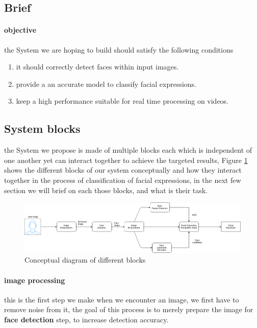 \subsection{Brief}
\paragraph{objective}
the System we are hoping to build should satisfy the following conditions
\begin{enumerate}
	\item it should correctly detect faces within input images.
	\item provide a an accurate model to classify facial expressions.
	\item keep a high performance suitable for real time processing on videos.
\end{enumerate}

\subsection{System blocks}
the System we propose is made of multiple blocks each which is independent of one another yet can interact together to achieve the targeted results, Figure 
\ref{fig:facial_expression_detection} shows the different blocks of our system conceptually and how they interact together in the process of classification of facial expressions, in the next few section we will brief on each those blocks, and what is their task. 

\begin{figure}
	\centering
	\includegraphics[width=\textwidth]{images/facial_expression_detection.png}
	\caption{Conceptual diagram of different blocks}
	\label{fig:facial_expression_detection}
\end{figure}

\paragraph{image processing}
this is the first step we make when we encounter an image, we first have to remove noise from it, the goal of this process is to merely prepare the image for \textbf{face detection} step, to increase detection accuracy.

